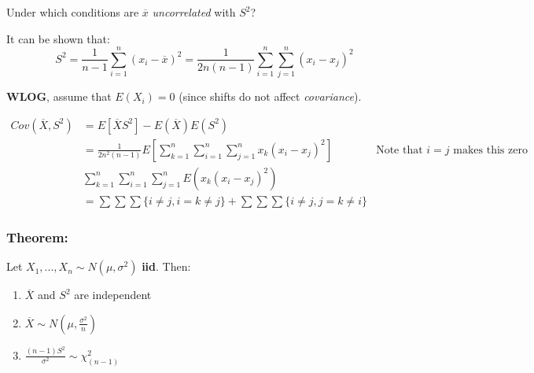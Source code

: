 \documentclass{article}
\begin{document}
\noindent Under which conditions are $\overline{x}$ \textit{uncorrelated} with $S^2$?

It can be shown that:
\begin{equation*}
    S^2 = \frac{1}{n-1}\sum_{i=1}^n (x_i - \overline{x})^2 = \frac{1}{2n(n-1)}\sum_{i=1}^n \sum_{j=1}^n (x_i - x_j)^2
\end{equation*}

\textbf{WLOG}, assume that $E(X_i) = 0$ (since shifts do not affect \textit{covariance}).

\begin{equation*}
    \begin{split}
        Cov(\overline{X},S^2) &= E[\overline{X}S^2] - E(\overline{X}) E(S^2)\\
        &= \frac{1}{2n^2(n-1)}E\left[\sum_{k=1}^n \sum_{i=1}^n \sum_{j=1}^n x_k(x_i-x_j)^2 \right]
        &\text{Note that $i=j$ makes this zero}\\
        &\sum_{k=1}^n \sum_{i=1}^n \sum_{j=1}^n E(x_k(x_i-x_j)^2)\\
        &= \sum\sum\sum\{i\neq j,  i = k \neq j\} + \sum\sum\sum\{i \neq j, j = k \neq i \}
    \end{split}
\end{equation*}

\subsubsection*{Theorem:}

Let $X_1,...,X_n \sim N(\mu,\sigma^2)$ \textbf{iid}. Then:
\begin{enumerate}
    \item $\overline{X}$ and $S^2$ are independent
    \item $\overline{X}\sim N(\mu,\frac{\sigma^2}{n})$
    \item $\frac{(n-1)S^2}{\sigma^2} \sim \chi^2_{(n-1)}$
\end{enumerate}
\end{document}
